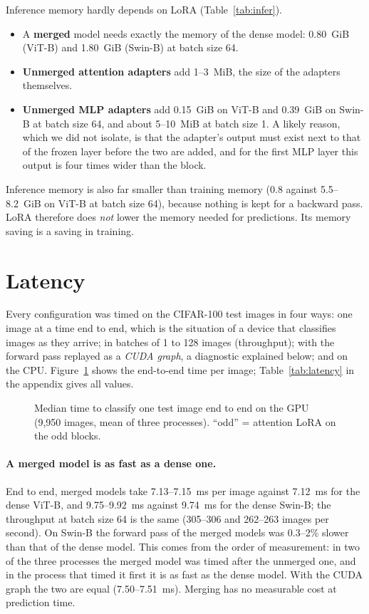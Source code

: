 Inference memory hardly depends on LoRA (Table~\ref{tab:infer}).
\begin{itemize}
  \item A \textbf{merged} model needs exactly the memory of the dense model: 0.80~GiB (ViT-B) and 1.80~GiB (Swin-B)
        at batch size 64.
  \item \textbf{Unmerged attention adapters} add 1--3~MiB, the size of the adapters themselves.
  \item \textbf{Unmerged MLP adapters} add 0.15~GiB on ViT-B and 0.39~GiB on Swin-B at batch size 64, and about
        5--10~MiB at batch size 1. A likely reason, which we did not isolate, is that the adapter's output must exist
        next to that of the frozen layer before the two are added, and for the first MLP layer this output is four
        times wider than the block.
\end{itemize}
Inference memory is also far smaller than training memory (0.8 against 5.5--8.2~GiB on ViT-B at batch size 64),
because nothing is kept for a backward pass. LoRA therefore does \emph{not} lower the memory needed for
predictions. Its memory saving is a saving in training.

\section{Latency}
\label{sec:latency}

Every configuration was timed on the CIFAR-100 test images in four ways: one image at a time end to end, which is
the situation of a device that classifies images as they arrive; in batches of 1 to 128 images (throughput); with
the forward pass replayed as a \emph{CUDA graph}, a diagnostic explained below; and on the CPU.
Figure~\ref{fig:latency} shows the end-to-end time per image; Table~\ref{tab:latency} in the appendix gives all values.


\begin{figure}[!htb]
\centering

\caption{Median time to classify one test image end to end on the GPU (9,950 images, mean of three processes).
``odd'' = attention LoRA on the odd blocks.}
\label{fig:latency}
\end{figure}

\paragraph{A merged model is as fast as a dense one.} End to end, merged models take 7.13--7.15~ms per image
against 7.12~ms for the dense ViT-B, and 9.75--9.92~ms against 9.74~ms for the dense Swin-B; the throughput at
batch size 64 is the same (305--306 and 262--263 images per second). On Swin-B the forward pass of the merged
models was 0.3--2\% slower than that of the dense model. This comes from the order of measurement: in two of the
three processes the merged model was timed after the unmerged one, and in the process that timed it first it is as
fast as the dense model. With the CUDA graph the two are equal (7.50--7.51~ms). Merging has no measurable cost at
prediction time.

